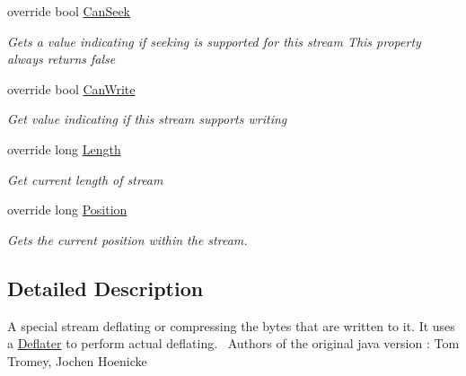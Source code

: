 \begin{DoxyCompactItemize}
override bool \hyperlink{class_i_c_sharp_code_1_1_sharp_zip_lib_1_1_zip_1_1_compression_1_1_streams_1_1_deflater_output_stream_a8d88f847c9840fcaa9cee68120892971}{Can\+Seek}
\begin{DoxyCompactList}\small\item\em Gets a value indicating if seeking is supported for this stream This property always returns false \end{DoxyCompactList}\item 
override bool \hyperlink{class_i_c_sharp_code_1_1_sharp_zip_lib_1_1_zip_1_1_compression_1_1_streams_1_1_deflater_output_stream_a17699b2a2ba6e44ebf740e76b6c8254a}{Can\+Write}
\begin{DoxyCompactList}\small\item\em Get value indicating if this stream supports writing \end{DoxyCompactList}\item 
override long \hyperlink{class_i_c_sharp_code_1_1_sharp_zip_lib_1_1_zip_1_1_compression_1_1_streams_1_1_deflater_output_stream_ad9a997404c9a3b143f1f3e7a1d9454a4}{Length}
\begin{DoxyCompactList}\small\item\em Get current length of stream \end{DoxyCompactList}\item 
override long \hyperlink{class_i_c_sharp_code_1_1_sharp_zip_lib_1_1_zip_1_1_compression_1_1_streams_1_1_deflater_output_stream_af902ca653ce9aa1d3e4b6afcc2dbe765}{Position}
\begin{DoxyCompactList}\small\item\em Gets the current position within the stream. \end{DoxyCompactList}\end{DoxyCompactItemize}


\subsection{Detailed Description}
A special stream deflating or compressing the bytes that are written to it. It uses a \hyperlink{class_i_c_sharp_code_1_1_sharp_zip_lib_1_1_zip_1_1_compression_1_1_deflater}{Deflater} to perform actual deflating.~\newline
 Authors of the original java version \+: Tom Tromey, Jochen Hoenicke 



